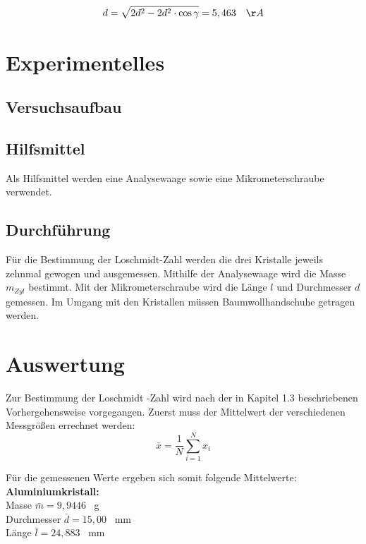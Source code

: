 \documentclass[12pt,a4paper,titlepage,headinclude,bibtotoc]{scrartcl}
\begin{document}
\begin{equation}
 d = \sqrt{2d^2-2d^2 \cdot \cos \gamma } = 5,463 \quad \AA
\end{equation}   

\section{Experimentelles}

\subsection{Versuchsaufbau}
\subsection{Hilfsmittel}
Als Hilfsmittel werden eine Analysewaage sowie eine Mikrometerschraube verwendet.

\subsection{Durchführung}

Für die Bestimmung der Loschmidt-Zahl werden die drei Kristalle jeweils zehnmal gewogen und ausgemessen. Mithilfe der Analysewaage wird die Masse $m_{Zyl}$ bestimmt. Mit der Mikrometerschraube wird die Länge $l$ und Durchmesser $d$ gemessen. Im Umgang mit den Kristallen müssen Baumwollhandschuhe getragen werden. 

\section{Auswertung}
Zur Bestimmung der Loschmidt -Zahl wird nach der in Kapitel 1.3 beschriebenen Vorhergehensweise vorgegangen. Zuerst muss der Mittelwert der verschiedenen Messgrößen errechnet werden:
\begin{equation}
\bar{x}=\frac{1}{N} \sum_{i=1}^N x_i
\end{equation}

Für die gemessenen Werte ergeben sich somit folgende Mittelwerte:\\

\vspace{3mm}
\textbf{Aluminiumkristall:}\\
Masse $\bar{m}=9,9446$ \ g \\
Durchmesser $\bar{d}=15,00$ \ mm \\
Länge $\bar{l}=24,883$ \ mm\\
\end{document}
